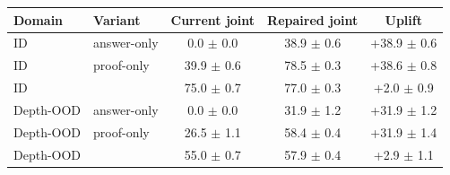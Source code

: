 \begin{tabular}{llccc}
\toprule
Domain & Variant & Current joint & Repaired joint & Uplift \\
\midrule
ID & answer-only & 0.0 $\pm$ 0.0 & 38.9 $\pm$ 0.6 & +38.9 $\pm$ 0.6 \\
ID & proof-only & 39.9 $\pm$ 0.6 & 78.5 $\pm$ 0.3 & +38.6 $\pm$ 0.8 \\
ID & \model{} & 75.0 $\pm$ 0.7 & 77.0 $\pm$ 0.3 & +2.0 $\pm$ 0.9 \\
\midrule
Depth-OOD & answer-only & 0.0 $\pm$ 0.0 & 31.9 $\pm$ 1.2 & +31.9 $\pm$ 1.2 \\
Depth-OOD & proof-only & 26.5 $\pm$ 1.1 & 58.4 $\pm$ 0.4 & +31.9 $\pm$ 1.4 \\
Depth-OOD & \model{} & 55.0 $\pm$ 0.7 & 57.9 $\pm$ 0.4 & +2.9 $\pm$ 1.1 \\
\bottomrule
\end{tabular}